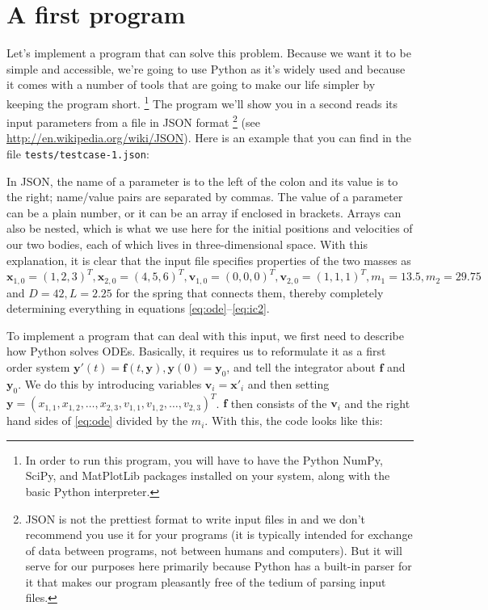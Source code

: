 \documentclass{article}
\begin{document}
\section{A first program}
\label{sec:first-steps}

Let's implement a program that can solve this problem. Because we want it
to be simple and accessible, we're going to use Python as it's widely used and
because it comes with a number of tools that are going to make our life
simpler by keeping the program short.%
\footnote{In order to run this program, you will have to have the Python
  NumPy, SciPy, and MatPlotLib packages installed on your system, along with
  the basic Python interpreter.}
The program we'll show you in a second reads its input parameters from a file in JSON format%
\footnote{JSON is not the prettiest format to write input files in and we
  don't recommend you use it for your programs (it is typically intended for
  exchange of data between programs, not between humans and computers). But it
  will serve for our purposes here primarily because Python has a built-in
  parser for it that makes our program pleasantly free of the tedium of
  parsing input files.} (see
\url{http://en.wikipedia.org/wiki/JSON}).
Here is an example that you can find in the file \texttt{tests/testcase-1.json}:

In JSON, the name of a parameter is to the left of the colon and its value is
to the right; name/value pairs are separated by commas. The value of a
parameter can be a plain number, or it can be an array if enclosed in
brackets. Arrays can also be nested, which is what we use here for the initial
positions and velocities of our two bodies, each of which lives in
three-dimensional space. With this explanation, it is clear that the input file
specifies properties of the two masses as $\mathbf x_{1,0}=(1,2,3)^T, \mathbf
x_{2,0}=(4,5,6)^T, \mathbf v_{1,0}=(0,0,0)^T, \mathbf v_{2,0}=(1,1,1)^T,
m_1=13.5, m_2=29.75$ and $D=42, L=2.25$ for the spring that connects them, 
thereby completely determining everything in equations
\eqref{eq:ode}--\eqref{eq:ic2}.

To implement a program that can deal with this input, we first need to
describe how Python solves ODEs. Basically, it requires us to reformulate it
as a first order system $\mathbf y'(t)=\mathbf f(t,\mathbf y), \mathbf
y(0)=\mathbf y_0$, and tell the integrator about $\mathbf f$ and $\mathbf
y_0$. We do this by introducing variables $\mathbf v_i=\mathbf x'_i$ and then
setting $\mathbf
y=(x_{1,1},x_{1,2},\ldots,x_{2,3},v_{1,1},v_{1,2},\ldots,v_{2,3})^T$. $\mathbf
f$ then consists of the $\mathbf v_i$ and the right hand sides of
\eqref{eq:ode} divided by the $m_i$. With this, the code looks like this:
\end{document}
